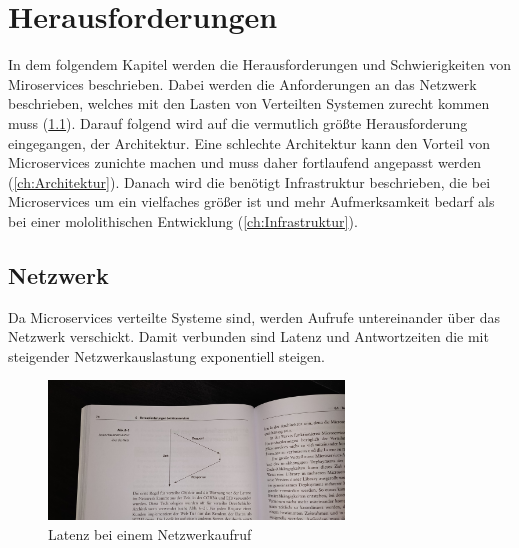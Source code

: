\chapter{Herausforderungen}\label{ch:Herausforderungen}

In dem folgendem Kapitel werden die Herausforderungen und Schwierigkeiten von Miroservices beschrieben. Dabei werden die Anforderungen an das Netzwerk beschrieben, welches mit den Lasten von Verteilten Systemen zurecht kommen muss (\ref{ch:netzwerk}). Darauf folgend wird auf die vermutlich größte Herausforderung eingegangen, der Architektur. Eine schlechte Architektur kann den Vorteil von Microservices zunichte machen und muss daher fortlaufend angepasst werden (\ref{ch:Architektur}). Danach wird die benötigt Infrastruktur beschrieben, die bei Microservices um ein vielfaches größer ist und mehr Aufmerksamkeit bedarf als bei einer mololithischen Entwicklung (\ref{ch:Infrastruktur}).

\section{Netzwerk} \label{ch:netzwerk}

Da Microservices verteilte Systeme sind, werden Aufrufe untereinander über das Netzwerk verschickt. Damit verbunden sind Latenz und Antwortzeiten die mit steigender Netzwerkauslastung exponentiell steigen. \newline
\begin{figure}[bth] 
	\centering
	\includegraphics[width=0.7\textwidth]{Graphics/Latenz}
	\caption{Latenz bei einem Netzwerkaufruf}
	\label{fig:Latenz}
\end{figure}

